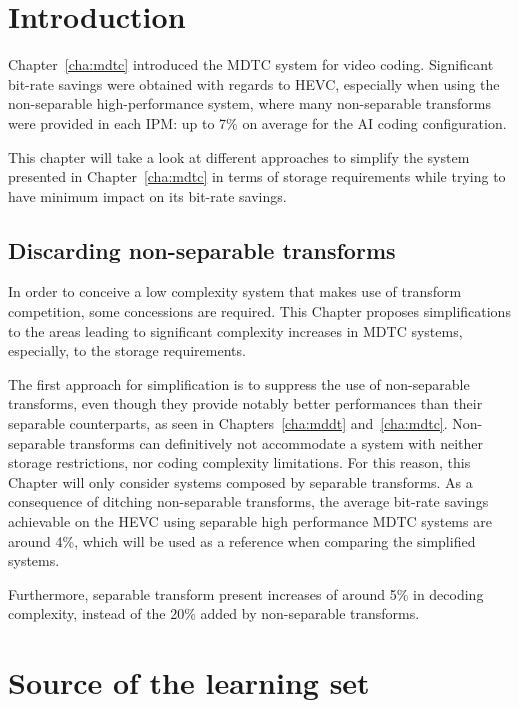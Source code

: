 \documentclass[11pt,a4paper,openright,twoside]{book}
\numberwithin{equation}{section} %
\numberwithin{figure}{section} %
\numberwithin{table}{section} %
\begin{document}
\section{Introduction}
\label{sec:rw_introduction}

Chapter~\ref{cha:mdtc} introduced the \acf{MDTC} system for video coding.
Significant bit-rate savings were obtained with regards to \ac{HEVC},
especially when using the non-separable high-performance system, where many
non-separable transforms were provided in each \ac{IPM}:
up to 7\% on average for the \ac{AI} coding configuration.

This chapter will take a look at different approaches to simplify the
system presented in Chapter~\ref{cha:mdtc} in terms of storage requirements
while trying to have minimum impact on its bit-rate savings.

\subsection{Discarding non-separable transforms}
\label{sub:discarding_non_separable_transforms}

In order to conceive a low complexity system that makes use of transform
competition, some concessions are required.
This Chapter proposes simplifications to the areas leading to significant
complexity increases in \ac{MDTC} systems, especially, to the storage
requirements.

The first approach for simplification is to suppress the use of non-separable
transforms, even though they provide notably better performances than their
separable counterparts, as seen in Chapters~\ref{cha:mddt} and~\ref{cha:mdtc}.
Non-separable transforms can definitively not accommodate a system with
neither storage restrictions, nor coding complexity limitations.
For this reason, this Chapter will only consider systems composed by separable
transforms.
As a consequence of ditching non-separable transforms, the average bit-rate
savings achievable on the \ac{HEVC} using separable high performance \ac{MDTC}
systems are around 4\%, which will be used as a reference when comparing the
simplified systems.

Furthermore, separable transform present increases of around 5\% in decoding
complexity, instead of the 20\% added by non-separable transforms.

\section{Source of the learning set}
\label{sec:rw_source_of_the_learning_set}
\end{document}
